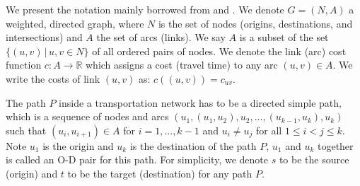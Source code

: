 We present the notation mainly borrowed from \citet{Cormen} and \citet{Klunder}.
We denote $ G = ( N, A ) $ a weighted, directed graph,
where $ N $ is the set of nodes (origins, destinations, and intersections)
and $ A $ the set of arcs (links).
We say $ A $ is a subset of the set $ \{ (u, v)\, | \, u, v \in N \} $ of all ordered pairs of nodes.
We denote the link (arc) cost function $ c : A \rightarrow \mathbb{R} $ which assigns a cost (travel time) to any arc $ (u,v) \in A $.
We write the costs of link $(u, v)$ as: $ c((u, v)) = c_{uv} $.

The path $P$ inside a transportation network has to be a directed simple path, 
which is a sequence of nodes and arcs $ (u_1, (u_1, u_2), u_2, \ldots , (u_{k-1}, u_k), u_k ) $
such that $ (u_i, u_{i+1}) \in A$ for $i = 1,\ldots,k-1$ and $u_i \neq u_j$ for all $ 1 \leq i < j \leq k$.
Note $u_1$ is the origin and $u_k$ is the destination of the path $P$, $u_1$ and $u_k$ together is called an O-D pair for this path.
For simplicity, we denote $s$ to be the source (origin) and $t$ to be the target (destination) for any path $P$.


